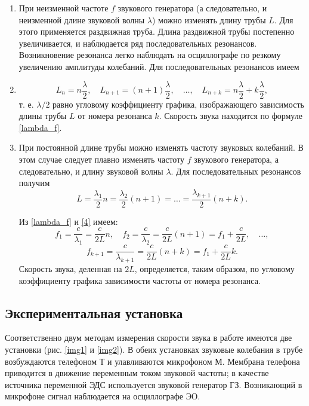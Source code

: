 \documentclass[a4paper, 12pt]{article}
\begin{document}
\begin{enumerate}
\item При неизменной частоте $ f $ звукового генератора (а следовательно, и неизменной длине звуковой волны $ \lambda $) можно изменять длину трубы $ L $. Для этого применяется раздвижная труба. Длина раздвижной трубы постепенно увеличивается, и наблюдается ряд последовательных резонансов. Возникновение резонанса легко наблюдать на осциллографе по резкому увеличению амплитуды колебаний. Для последовательных резонансов имеем
\item 
\begin{equation}\label{first}
L_n=n\frac{\lambda}{2}, \quad L_{n+1}=(n+1)\frac{\lambda}{2}, \quad \dots, \quad L_{n+k} = n\frac{\lambda}{2}+k\frac{\lambda}{2},
\end{equation}
 т. е. $ \lambda/2 $ равно угловому коэффициенту графика, изображающего зависимость длины трубы $ L $ от номера резонанса $ k $. Скорость звука находится по формуле \eqref{lambda_f}.
\item При постоянной длине трубы можно изменять частоту звуковых колебаний. В этом случае следует плавно изменять частоту $ f $ звукового генератора, а следовательно, и длину звуковой волны $ \lambda $. Для последовательных резонансов получим 
\begin{equation}\label{4}
L=\frac{\lambda_1}{2}n=\frac{\lambda_2}{2}(n+1)=\dots=\frac{\lambda_{k+1}}{2}(n+k).
\end{equation}

Из \eqref{lambda_f} и \eqref{4} имеем:
\[ f_1=\frac{c}{\lambda_1}=\frac{c}{2L}n, \quad f_2=\frac{c}{\lambda_2}=\frac{c}{2L}(n+1)=f_1+\frac{c}{2L},\quad \dots, \]
\begin{equation}\label{5}
f_{k+1}=\frac{c}{\lambda_{k+1}}=\frac{c}{2L}(n+k)=f_1+\frac{c}{2L}k.
\end{equation}
Скорость звука, деленная на $ 2L $, определяется, таким образом, по угловому коэффициенту графика зависимости частоты от номера резонанса.
\end{enumerate}

\begin{center}
\subsection*{Экспериментальная установка}
\end{center}

Соответственно двум методам измерения скорости звука в работе имеются две установки (рис. \ref{img1} и \ref{img2}). В обеих установках звуковые колебания в трубе возбуждаются телефоном Т и улавливаются микрофоном М. Мембрана телефона приводится в движение переменным током звуковой частоты; в качестве источника переменной ЭДС используется звуковой генератор ГЗ. Возникающий в микрофоне сигнал наблюдается на осциллографе ЭО.
\end{document}
